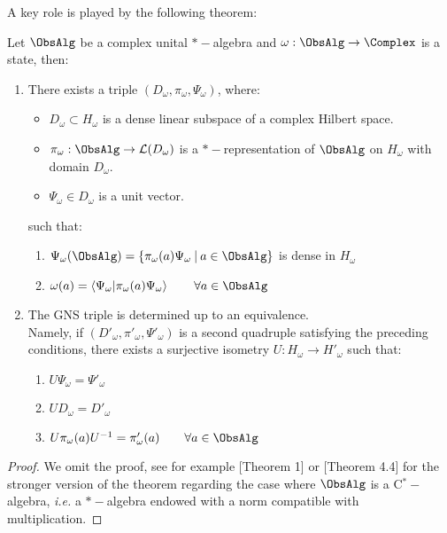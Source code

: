 \documentclass[Main]{subfiles}
\begin{document}
				\vspace{3mm}
				A key role is played by the following theorem:
				\begin{theorem}
					Let $\ObsAlg$ be a complex unital $\ast-$algebra and $\omega: \ObsAlg \rightarrow \Complex$ is a state, then:
					\begin{enumerate}
						\item There exists a triple $\left( D_\omega, \pi_\omega, \Psi_\omega \right)$, where:
							\begin{itemize}
								\item $D_\omega \subset H_\omega$ is a dense linear subspace of a complex Hilbert space.
								\item $\pi_\omega:\ObsAlg \rightarrow  \mathcal{L}(D_\omega)$ is a $\ast-$representation of $\ObsAlg$ on $H_\omega$ with domain $D_\omega$.
								\item $\Psi_\omega \in D_\omega$ is a unit vector.
							\end{itemize}
							such that:
							\begin{enumerate}
								\item
								$\Psi_\omega ( \ObsAlg) = \left\lbrace \pi_\omega ( a) \Psi_\omega \: \vert \: a \in \ObsAlg \right\rbrace$ is dense in $H_\omega$
								\item $\omega (a) = \left\langle \Psi_\omega \vert \pi_\omega ( a) \Psi_\omega \right\rangle \qquad \forall a \in \ObsAlg$
							\end{enumerate}
							\item The GNS triple is determined up to an equivalence.
							\\
							Namely, if $\left( D'_\omega, \pi'_\omega, \Psi'_\omega \right)$ is a second quadruple satisfying the preceding conditions, there exists a surjective isometry $U: H_\omega \rightarrow H'_\omega$ such that:
							\begin{enumerate}
								\item $U \Psi_\omega = \Psi'_\omega$
								\item $U D_\omega = D'_\omega$
								\item $U \pi_\omega(a) U^{-1} = \pi'_\omega (a) \qquad \forall a \in \ObsAlg$
							\end{enumerate}
					\end{enumerate}
				\end{theorem}
				\begin{proof}
					We omit the proof, see for example \cite{Khavkine2014a}[Theorem 1] or \cite{Benini2013}[Theorem 4.4] for the stronger version of the theorem regarding the case where $\ObsAlg$ is a C$^\ast-$algebra,  \textit{i.e.} a $\ast-$algebra endowed with a norm compatible with multiplication.
				\end{proof}
\end{document}
